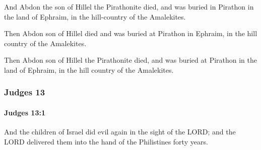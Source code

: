 			\begin{versebox}
					\item[BHS] 
					\item[ASV] And Abdon the son of Hillel the Pirathonite died, and was buried in Pirathon in the land of Ephraim, in the hill-country of the Amalekites.
					\item[NIV] Then Abdon son of Hillel died and was buried at Pirathon in Ephraim, in the hill country of the Amalekites.
					\item[NRSV] Then Abdon son of Hillel the Pirathonite died, and was buried at Pirathon in the land of Ephraim, in the hill country of the Amalekites.
			\end{versebox}
	\subsubsection{Judges 13} %
		\label{JUDGES-13}

		\paragraph{Judges 13:1} %
			\label{JUDGES-13-1}

			And the children of Israel did evil again in the sight of the LORD; and the LORD delivered them into the hand of the Philistines forty years.

